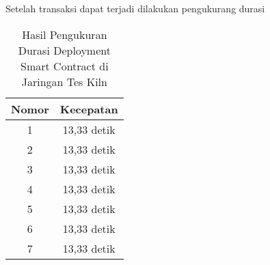 Setelah transaksi dapat terjadi dilakukan pengukurang durasi 

\begin{longtable}{|c|c|}
  \caption{Hasil Pengukuran Durasi Deployment Smart Contract di Jaringan Tes Kiln}
  \label{tb:kilnspeed}\\
  \hline
  \rowcolor[HTML]{C0C0C0}
  \textbf{Nomor} & \textbf{Kecepatan} \\
  \hline
  1 & 13,33 detik \\
  2 & 13,33 detik \\
  3 & 13,33 detik \\
  4 & 13,33 detik \\
  5 & 13,33 detik \\
  6 & 13,33 detik \\
  7 & 13,33 detik \\
  \hline
\end{longtable}